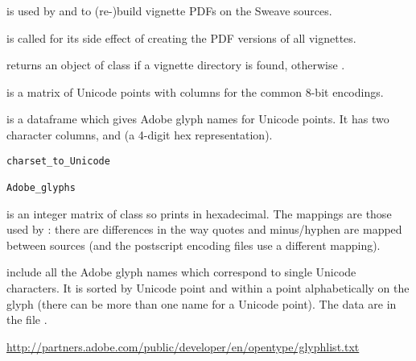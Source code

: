 %
\begin{Details}\relax
{} is used by  and  to (re-)build vignette PDFs on the Sweave sources.
\end{Details}
%
\begin{Value}
 is called for its side effect of creating the
PDF versions of all vignettes.

 returns an object of class 
if a vignette directory is found, otherwise .
\end{Value}
%
\begin{Description}\relax
{} is a matrix of Unicode points with columns
for the common 8-bit encodings.

 is a dataframe which gives Adobe glyph names for
Unicode points. It has two character columns,  and
 (a 4-digit hex representation).
\end{Description}
%
\begin{Usage}
\begin{verbatim}
charset_to_Unicode

Adobe_glyphs
\end{verbatim}
\end{Usage}
%
\begin{Details}\relax
{} is an integer matrix of class
 so prints in hexadecimal.
The mappings are those used by : there are differences
in the way quotes and minus/hyphen are mapped between sources (and the
postscript encoding files use a different mapping).

 include all the Adobe glyph names which correspond to
single Unicode characters.  It is sorted by Unicode point and within a
point alphabetically on the glyph (there can be more than one name for
a Unicode point).  The data are in the file
.
\end{Details}
%
\begin{Source}\relax
\url{http://partners.adobe.com/public/developer/en/opentype/glyphlist.txt}
\end{Source}
